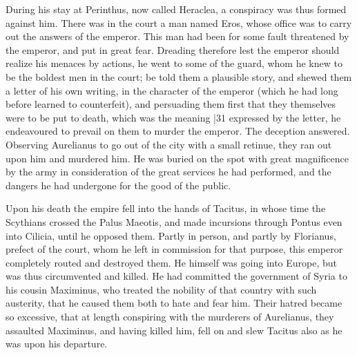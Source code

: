 During his stay at Perinthus, now called Heraclea, a conspiracy was thus formed against him. There was in the court a man named Eros, whose office was to carry out the answers of the emperor. This man had been for some fault threatened by the emperor, and put in great fear. Dreading therefore lest the emperor should realize his menaces by actions, he went to some of the guard, whom he knew to be the boldest men in the court; be told them a plausible story, and shewed them a letter of his own writing, in the character of the emperor (which he had long before learned to counterfeit), and persuading them first that they themselves were to be put to death, which was the meaning
|31 expressed by the letter, he endeavoured to prevail on them to murder the emperor. The deception answered. Observing Aurelianus to go out of the city with a small retinue, they ran out upon him and murdered him. He was buried on the spot with great magnificence by the army in consideration of the great services he had performed, and the dangers he had undergone for the good of the public.

Upon his death the empire fell into the hands of Tacitus, in whose time the Scythians crossed the Palus Maeotis, and made incursions through Pontus even into Cilicia, until he opposed them. Partly in person, and partly by Florianus, prefect of the court, whom he left in commission for that purpose, this emperor completely routed and destroyed them. He himself was going into Europe, but was thus circumvented and killed. He had committed the government of Syria to his cousin Maximinus, who treated the nobility of that country with such austerity, that he caused them both to hate and fear him. Their hatred became so excessive, that at length conspiring with the murderers of Aurelianus, they assaulted Maximinus, and having killed him, fell on and slew Tacitus also as he was upon his departure.

